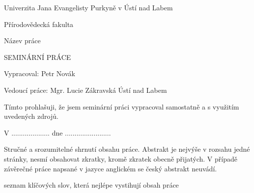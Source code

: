 \documentclass[12pt,a4paper,oneside]{article}
\begin{document}
\pagestyle{empty} %

\begin{center}
\Large
Univerzita Jana Evangelisty Purkyně
v Ústí nad Labem

Přírodovědecká fakulta

\vspace*{\fill}

\Huge
Název práce

\Large
SEMINÁRNÍ PRÁCE

\vspace{4em}
\vspace*{\fill}

\end{center}

{\setlength\parindent{0pt} %
Vypracoval: Petr Novák

Vedoucí práce: Mgr. Lucie Zákravská
\hfill Ústí nad Labem \the\year}

\clearpage

\vspace*{\fill}

Tímto prohlašuji, že jsem seminární práci vypracoval samostatně
a s využitím uvedených zdrojů. %

V .................... dne ........................
   
\hspace{8.5cm} \makebox[2in]{\hrulefill}
  				 
\hspace{8.5cm} 	

\clearpage

{
	\abstract
	\noindent
	Stručné a srozumitelné shrnutí obsahu práce. Abstrakt je nejvýše v rozsahu
	jedné stránky, nesmí obsahovat zkratky, kromě zkratek obecně přijatých. V
	případě závěrečné práce napsané v jazyce anglickém se český abstrakt
	neuvádí.
}

{
	\renewcommand{\abstractname}{Klíčová slova}
	\abstract
	\noindent
	seznam klíčových slov, která nejlépe vystihují obsah práce
}

\clearpage

\tableofcontents
\clearpage

\pagestyle{fancy}

\clearpage
\printbibliography
\end{document}
